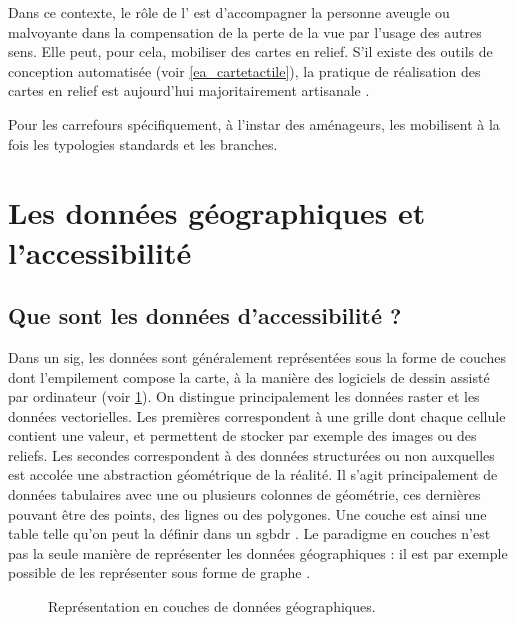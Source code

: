 Dans ce contexte, le rôle de l'\ipa{} est d'accompagner la personne aveugle ou malvoyante dans la compensation de la perte de la vue par l'usage des autres sens. Elle peut, pour cela, mobiliser des cartes en relief. S'il existe des outils de conception automatisée (voir \ref{ea_cartetactile}), la pratique de réalisation des cartes en relief est aujourd'hui majoritairement artisanale .

Pour les carrefours spécifiquement, à l'instar des aménageurs, les \ipas{} mobilisent à la fois les typologies standards et les branches. \todo{}

\section{Les données géographiques et l'accessibilité}

\subsection{Que sont les données d'accessibilité ?}


Dans un \gls{sig}, les données sont généralement représentées sous la forme de couches dont l'empilement compose la carte, à la manière des logiciels de dessin assisté par ordinateur (voir \ref{fig:geodatalayers}). On distingue principalement les données raster et les données vectorielles. Les premières correspondent à une grille dont chaque cellule contient une valeur, et permettent de stocker par exemple des images ou des reliefs. Les secondes correspondent à des données structurées ou non auxquelles est accolée une abstraction géométrique de la réalité. Il s'agit principalement de données tabulaires avec une ou plusieurs colonnes de géométrie, ces dernières pouvant être des points, des lignes ou des polygones. Une couche est ainsi une table telle qu'on peut la définir dans un \gls{sgbdr} \cite{AschanLeygonie2019}. Le paradigme en couches n'est pas la seule manière de représenter les données géographiques : il est par exemple possible de les représenter sous forme de graphe \cite{Palacio2003}.

\begin{figure}
    \centering
    \caption{
        Représentation en couches de données géographiques.}
    \label{fig:geodatalayers}
\end{figure}


